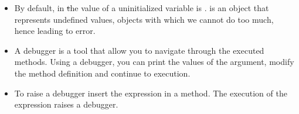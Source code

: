 \begin{itemize}
\item By default, in \st the value of a uninitialized variable is \nil. \nil is an object that represents undefined values, \ie objects with which we cannot do too much, hence leading to error.

\item A debugger is a tool that allow you to navigate through the executed methods. Using a debugger, you can print the values of the argument, modify the method definition and continue to execution.

\item To raise a debugger insert the expression  in a method. The execution of the expression  raises a debugger. 
\end{itemize}










%

%


